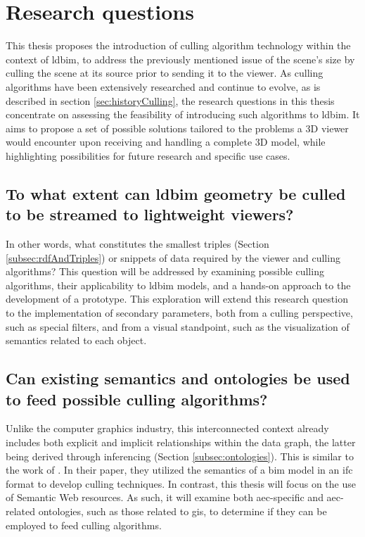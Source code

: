 \section{Research questions}\label{sec:researchQuestions}
This thesis proposes the introduction of culling algorithm technology within the context of \ac{ldbim}, to address the previously mentioned issue of the scene's size by culling the scene at its source prior to sending it to the viewer. As culling algorithms have been extensively researched and continue to evolve, as is described in section \ref{sec:historyCulling}, the research questions in this thesis concentrate on assessing the feasibility of introducing such algorithms to \ac{ldbim}. It aims to propose a set of possible solutions tailored to the problems a 3D viewer would encounter upon receiving and handling a complete 3D model, while highlighting possibilities for future research and specific use cases.

\subsection[Can \acs{ldbim} be culled?]{To what extent can \acs{ldbim} geometry be culled \\
    to be streamed to lightweight viewers?} \label{subsec:rq1}
In other words, what constitutes the smallest triples (Section \ref{subsec:rdfAndTriples}) or snippets of data required by the viewer and culling algorithms? This question will be addressed by examining possible culling algorithms, their applicability to \ac{ldbim} models, and a hands-on approach to the development of a prototype. This exploration will extend this research question to the implementation of secondary parameters, both from a culling perspective, such as special filters, and from a visual standpoint, such as the visualization of semantics related to each object.

\subsection[Can existing semantics be used?]{Can existing semantics and ontologies be used\\
    to feed possible culling algorithms?}\label{subsec:rq2}
Unlike the computer graphics industry, this interconnected context already includes both explicit and implicit relationships within the data graph, the latter being derived through inferencing (Section \ref{subsec:ontologies}). This is similar to the work of \cite{Johansson2009}. In their paper, they utilized the semantics of a \ac{bim} model in an \ac{ifc} format to develop culling techniques. In contrast, this thesis will focus on the use of Semantic Web resources. As such, it will examine both \ac{aec}-specific and \ac{aec}-related ontologies, such as those related to \ac{gis}, to determine if they can be employed to feed culling algorithms.

